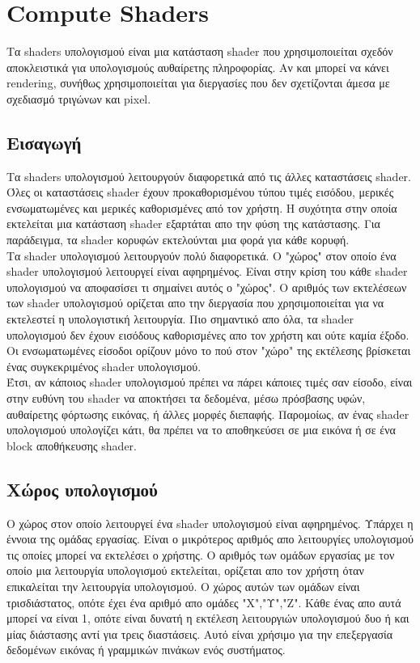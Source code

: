 \section{Compute Shaders}
Τα shaders υπολογισμού είναι μια κατάσταση shader που χρησιμοποιείται σχεδόν αποκλειστικά για υπολογισμούς αυθαίρετης πληροφορίας. Αν και μπορεί να κάνει rendering, συνήθως χρησιμοποιείται για διεργασίες που δεν σχετίζονται άμεσα με σχεδιασμό τριγώνων και pixel.\cite{computeshaders-1}
\subsection{Εισαγωγή}
Τα shaders υπολογισμού λειτουργούν διαφορετικά από τις άλλες καταστάσεις shader. Όλες οι καταστάσεις shader έχουν προκαθορισμένου τύπου τιμές εισόδου, μερικές ενσωματωμένες και μερικές καθορισμένες από τον χρήστη. Η συχότητα στην οποία εκτελείται μια κατάσταση shader εξαρτάται απο την φύση της κατάστασης. Για παράδειγμα, τα shader κορυφών εκτελούνται μια φορά για κάθε κορυφή. \\
Τα shader υπολογισμού λειτουργούν πολύ διαφορετικά. Ο "χώρος" στον οποίο ένα shader υπολογισμού λειτουργεί είναι αφηρημένος. Είναι στην κρίση του κάθε shader υπολογισμού να αποφασίσει τι σημαίνει αυτός ο "χώρος". Ο αριθμός των εκτελέσεων των shader υπολογισμού ορίζεται απο την διεργασία που χρησιμοποιείται για να εκτελεστεί η υπολογιστική λειτουργία. Πιο σημαντικό απο όλα, τα shader υπολογισμού δεν έχουν εισόδους καθορισμένες απο τον χρήστη και ούτε καμία έξοδο. Οι ενσωματωμένες είσοδοι ορίζουν μόνο το πού στον "χώρο" της εκτέλεσης βρίσκεται ένας συγκεκριμένος shader υπολογισμού.\\
Έτσι, αν κάποιος shader υπολογισμού πρέπει να πάρει κάποιες τιμές σαν είσοδο, είναι στην ευθύνη του shader να αποκτήσει τα δεδομένα, μέσω πρόσβασης υφών, αυθαίρετης φόρτωσης εικόνας, ή άλλες μορφές διεπαφής. Παρομοίως, αν ένας shader υπολογισμού υπολογίζει κάτι, θα πρέπει να το αποθηκεύσει σε μια εικόνα ή σε ένα block αποθήκευσης shader.
\subsection{Χώρος υπολογισμού}
Ο χώρος στον οποίο λειτουργεί ένα shader υπολογισμού είναι αφηρημένος. Υπάρχει η έννοια της ομάδας εργασίας. Είναι ο μικρότερος αριθμός απο λειτουργίες υπολογισμού τις οποίες μπορεί να εκτελέσει ο χρήστης.
Ο αριθμός των ομάδων εργασίας με τον οποίο μια λειτουργία υπολογισμού εκτελείται, ορίζεται απο τον χρήστη όταν επικαλείται την λειτουργία υπολογισμού. Ο χώρος αυτών των ομάδων είναι τρισδιάστατος, οπότε έχει ένα αριθμό απο ομάδες "Χ","Υ","Ζ". Κάθε ένας απο αυτά μπορεί να είναι 1, οπότε είναι δυνατή η εκτέλεση λειτουργιών υπολογισμού δυο ή και μίας διάστασης αντί για τρεις διαστάσεις. Αυτό είναι χρήσιμο για την επεξεργασία δεδομένων εικόνας ή γραμμικών πινάκων ενός συστήματος.\\



